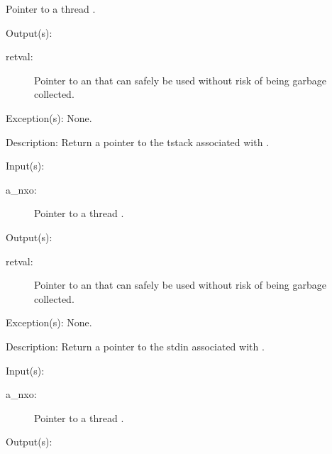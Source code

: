 \begin{capi}
\begin{capilist}
\begin{description}
			Pointer to a thread .
		\end{description}
	\item[Output(s): ]
		\begin{description}\item[]
		\item[retval: ]
			Pointer to an  that can safely be used
			without risk of being garbage collected.
		\end{description}
	\item[Exception(s): ] None.
	\item[Description: ]
		Return a pointer to the tstack associated with .
	\end{capilist}
\label{nxo_thread_stdin_get}
	\begin{capilist}
	\item[Input(s): ]
		\begin{description}\item[]
		\item[a\_nxo: ]
			Pointer to a thread .
		\end{description}
	\item[Output(s): ]
		\begin{description}\item[]
		\item[retval: ]
			Pointer to an  that can safely be used
			without risk of being garbage collected.
		\end{description}
	\item[Exception(s): ] None.
	\item[Description: ]
		Return a pointer to the stdin associated with .
	\end{capilist}
\label{nxo_thread_stdout_get}
	\begin{capilist}
	\item[Input(s): ]
		\begin{description}\item[]
		\item[a\_nxo: ]
			Pointer to a thread \classname{nxo}.
		\end{description}
	\item[Output(s): ]
		\begin{description}\item[]

\end{description}
\end{capilist}
\end{capi}
